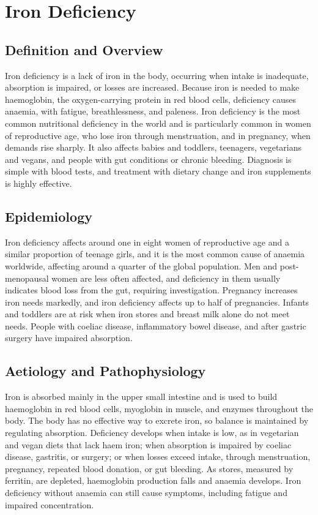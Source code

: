 \chapter{Iron Deficiency}

\section*{Definition and Overview}
Iron deficiency is a lack of iron in the body, occurring when intake is inadequate, absorption is impaired, or losses are increased. Because iron is needed to make haemoglobin, the oxygen-carrying protein in red blood cells, deficiency causes anaemia, with fatigue, breathlessness, and paleness. Iron deficiency is the most common nutritional deficiency in the world and is particularly common in women of reproductive age, who lose iron through menstruation, and in pregnancy, when demands rise sharply. It also affects babies and toddlers, teenagers, vegetarians and vegans, and people with gut conditions or chronic bleeding. Diagnosis is simple with blood tests, and treatment with dietary change and iron supplements is highly effective.

\section*{Epidemiology}
Iron deficiency affects around one in eight women of reproductive age and a similar proportion of teenage girls, and it is the most common cause of anaemia worldwide, affecting around a quarter of the global population. Men and post-menopausal women are less often affected, and deficiency in them usually indicates blood loss from the gut, requiring investigation. Pregnancy increases iron needs markedly, and iron deficiency affects up to half of pregnancies. Infants and toddlers are at risk when iron stores and breast milk alone do not meet needs. People with coeliac disease, inflammatory bowel disease, and after gastric surgery have impaired absorption.

\section*{Aetiology and Pathophysiology}
Iron is absorbed mainly in the upper small intestine and is used to build haemoglobin in red blood cells, myoglobin in muscle, and enzymes throughout the body. The body has no effective way to excrete iron, so balance is maintained by regulating absorption. Deficiency develops when intake is low, as in vegetarian and vegan diets that lack haem iron; when absorption is impaired by coeliac disease, gastritis, or surgery; or when losses exceed intake, through menstruation, pregnancy, repeated blood donation, or gut bleeding. As stores, measured by ferritin, are depleted, haemoglobin production falls and anaemia develops. Iron deficiency without anaemia can still cause symptoms, including fatigue and impaired concentration.

